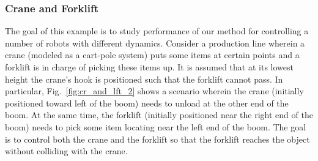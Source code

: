 \subsubsection{Crane and Forklift}
\label{subsec}
The goal of this example is to study performance of our method for controlling a number of robots with different dynamics. Consider a production line wherein a crane (modeled as a cart-pole system) puts some items at certain points and a forklift is in charge of picking these items up. It is assumed that at its lowest height the crane's hook is positioned such that the forklift cannot pass. In particular, Fig.~\ref{fig:cr_and_lft_2} shows a scenario wherein the crane (initially positioned toward left of the boom) needs to unload at the other end of the boom. At the same time, the forklift (initially positioned near the right end of the boom) needs to pick some item locating near the left end of the boom. The goal is to control both the crane and the forklift so that the forklift reaches the object without colliding with the crane. 

